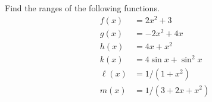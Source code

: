 Find the ranges of the following functions.
\begin{align*}
  f(x) &= 2x^2+3 \\
  g(x) &= -2x^2+4x \\
  h(x) &= 4x +x^2\\
  k(x) &= 4\sin x + \sin^2 x \\
  \ell(x) &= 1/(1+x^2)\\
  m(x) &= 1/(3+2x+x^2)
\end{align*}
